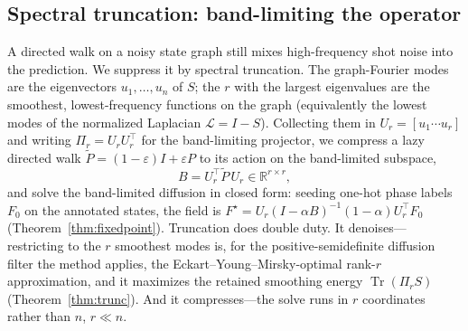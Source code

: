 \documentclass[aps,prresearch,reprint,amsmath,amssymb,nofootinbib,superscriptaddress,floatfix]{revtex4-2}
\theoremstyle{definition}
\theoremstyle{remark}
\theoremstyle{plain}
\begin{document}
\subsection{Spectral truncation: band-limiting the operator}
A directed walk on a noisy state graph still mixes high-frequency shot noise into the prediction. We
suppress it by spectral truncation. The graph-Fourier modes are the eigenvectors $u_1,\dots,u_n$ of $S$;
the $r$ with the largest eigenvalues are the smoothest, lowest-frequency functions on the graph
(equivalently the lowest modes of the normalized Laplacian $\mathcal L=I-S$). Collecting them in
$U_r=[u_1\cdots u_r]$ and writing $\Pi_r=U_rU_r^\top$ for the band-limiting projector, we compress a lazy
directed walk $\widetilde P=(1-\varepsilon)I+\varepsilon P$ to its action on the band-limited subspace,
\begin{equation}
B=U_r^\top\widetilde P\,U_r\in\mathbb{R}^{r\times r},
\label{eq:trunc}
\end{equation}
and solve the band-limited diffusion in closed form: seeding one-hot phase labels $F_0$ on the annotated
states, the field is $F^\star=U_r(I-\alpha B)^{-1}(1-\alpha)U_r^\top F_0$ (Theorem~\ref{thm:fixedpoint}).
Truncation does double duty. It denoises---restricting to the $r$ smoothest modes is, for the
positive-semidefinite diffusion filter the method applies, the Eckart--Young--Mirsky-optimal rank-$r$
approximation, and it maximizes the retained smoothing energy $\operatorname{Tr}(\Pi_r S)$
(Theorem~\ref{thm:trunc}). And it compresses---the solve runs in $r$ coordinates rather than $n$,
$r\ll n$.
\end{document}
